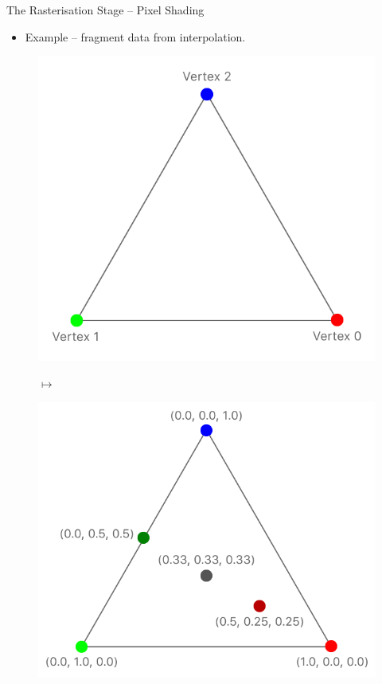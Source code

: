 \documentclass{beamer}
\begin{document}
\begin{frame}{The Rasterisation Stage -- Pixel Shading}

	\begin{itemize}
		\item Example -- fragment data from interpolation.
	\end{itemize}

	\vskip 1cm

	\begin{figure}
		\centering
		\begin{minipage}{.45\textwidth}
			\centering
			\includegraphics[width=.8\linewidth]{triangle}
		\end{minipage}%
		$\longmapsto$
		\begin{minipage}{.45\textwidth}
			\centering
			\includegraphics[width=.8\linewidth]{interpolation}
		\end{minipage}
	\end{figure}

\end{frame}
\end{document}
